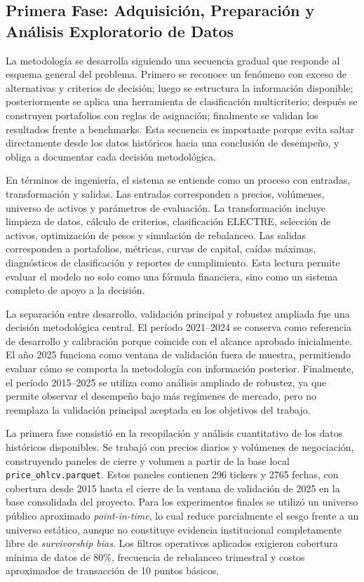 \documentclass[12pt,letterpaper]{article}
\begin{document}
\subsection{Primera Fase: Adquisición, Preparación y Análisis Exploratorio de Datos}

La metodología se desarrolla siguiendo una secuencia gradual que responde al esquema general del problema. Primero se reconoce un fenómeno con exceso de alternativas y criterios de decisión; luego se estructura la información disponible; posteriormente se aplica una herramienta de clasificación multicriterio; después se construyen portafolios con reglas de asignación; finalmente se validan los resultados frente a benchmarks. Esta secuencia es importante porque evita saltar directamente desde los datos históricos hacia una conclusión de desempeño, y obliga a documentar cada decisión metodológica.

En términos de ingeniería, el sistema se entiende como un proceso con entradas, transformación y salidas. Las entradas corresponden a precios, volúmenes, universo de activos y parámetros de evaluación. La transformación incluye limpieza de datos, cálculo de criterios, clasificación ELECTRE, selección de activos, optimización de pesos y simulación de rebalanceo. Las salidas corresponden a portafolios, métricas, curvas de capital, caídas máximas, diagnósticos de clasificación y reportes de cumplimiento. Esta lectura permite evaluar el modelo no solo como una fórmula financiera, sino como un sistema completo de apoyo a la decisión.

La separación entre desarrollo, validación principal y robustez ampliada fue una decisión metodológica central. El período 2021--2024 se conserva como referencia de desarrollo y calibración porque coincide con el alcance aprobado inicialmente. El año 2025 funciona como ventana de validación fuera de muestra, permitiendo evaluar cómo se comporta la metodología con información posterior. Finalmente, el período 2015--2025 se utiliza como análisis ampliado de robustez, ya que permite observar el desempeño bajo más regímenes de mercado, pero no reemplaza la validación principal aceptada en los objetivos del trabajo.


La primera fase consistió en la recopilación y análisis cuantitativo de los datos históricos disponibles. Se trabajó con precios diarios y volúmenes de negociación, construyendo paneles de cierre y volumen a partir de la base local \texttt{price\_ohlcv.parquet}. Estos paneles contienen 296 tickers y 2765 fechas, con cobertura desde 2015 hasta el cierre de la ventana de validación de 2025 en la base consolidada del proyecto. Para los experimentos finales se utilizó un universo público aproximado \textit{point-in-time}, lo cual reduce parcialmente el sesgo frente a un universo estático, aunque no constituye evidencia institucional completamente libre de \textit{survivorship bias}. Los filtros operativos aplicados exigieron cobertura mínima de datos de 80\%, frecuencia de rebalanceo trimestral y costos aproximados de transacción de 10 puntos básicos.
\end{document}
